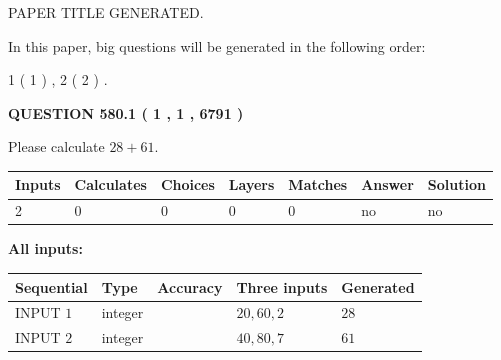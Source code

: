 \documentclass[12pt]{article}
\begin{document}
   
\vspace{0.2in}
   
   
   
   
   
   
   
   
 \vspace{0.2in}
 
 
 
 
   
   
 PAPER TITLE GENERATED.
   
   
   
\vspace{0.2in}
   
In this paper, big questions will be generated in the following order: 
   
   
   1 ( 1 )
 ,
   2 ( 2 )
 .
  
\vspace{0.2in}
  
{\textbf{\Large{QUESTION
580.1 
 ( 1 , 1 , 6791 )
}}}
  
  
 
Please calculate $ %
28 +  %
61 $.
 
 
   
   
   
   
\noindent\begin{tabular}{|l|l|l|l|l|l|l|}
 \hline
Inputs & Calculates & Choices & Layers & Matches & Answer & Solution \\ \hline
 2  & 
 0  & 
 0
  & 
 0  & 
 0  & 
  no & 
  no 
  \\ \hline
 \end{tabular}
   
   
   
   
\noindent{}
   
   
   
   
\noindent\vspace{0.1in}\hspace{-0.08in} {\textbf{\Large{All inputs: }}}
   
   
  
  
\noindent\begin{tabular}{|l|l|l|l|l|}
\hline
 Sequential & Type & Accuracy & Three inputs & Generated \\ 
\hline
 
 
  INPUT $  1 $ & integer &  & $
 20
 , 
 60
 , 
 2
 $ & $ 28 $ 
 \\  \hline  
 
 
  INPUT $  2 $ & integer &  & $
 40
 , 
 80
 , 
 7
 $ & $ 61 $ 
 \\  \hline  
 \end{tabular}
   
\end{document}
